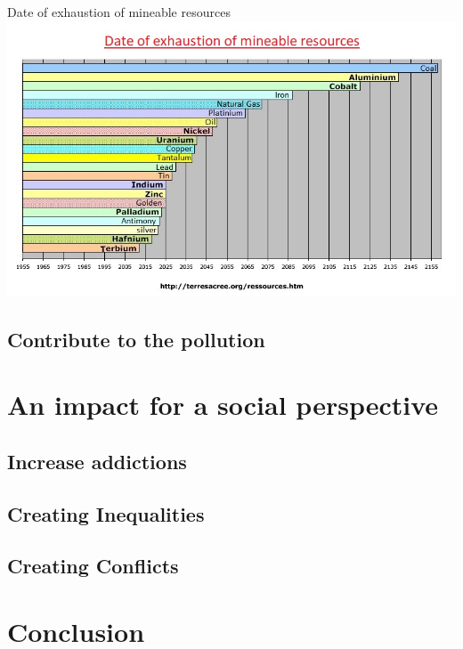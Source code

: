 \documentclass{beamer}
\begin{document}
\begin{frame}

\begin{block}{Date of exhaustion of mineable resources} 
\includegraphics[scale=0.45]{pics/image2.jpg}
\end{block}

\end{frame}

\subsection{Contribute to the pollution}



\section{An impact for a social perspective}

\subsection{Increase addictions}

\subsection{Creating Inequalities}

\subsection{Creating Conflicts}

\section{Conclusion}
    
\end{document}

